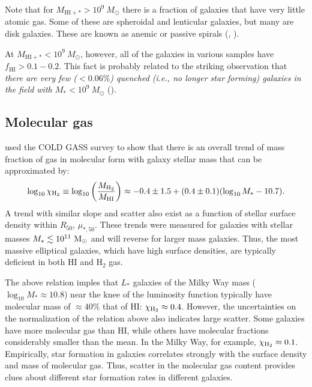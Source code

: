 Note that for $M_{\mathrm{HI+\ast}}>10^9\ M_{\odot}$ there is a fraction of galaxies that have very little atomic gas. Some of these are spheroidal and lenticular galaxies, but many are disk galaxies. These are known as anemic or passive spirals (\href{http://adsabs.harvard.edu/abs/1976ApJ...206..883V}{\citealt{van_den_bergh76}}, \href{http://adsabs.harvard.edu/abs/2002AJ....124..777E}{\citealt{elmegreen_etal02}}).

At $M_{\mathrm{HI+\ast}}<10^9\ M_{\odot}$, however, all of the galaxies in various samples have $f_{\mathrm{HI}}>0.1-0.2$. This fact is probably related to the striking observation that {\it there are very few ($<0.06\%$) quenched (i.e., no longer star forming) galaxies in the field with $M_*<10^9\ M_{\odot}$} (\href{http://adsabs.harvard.edu/abs/2012ApJ...757...85G}{\citealt{geha_etal12}}). 


\subsection{Molecular gas}

 \href{http://adsabs.harvard.edu/abs/2011MNRAS.415...32S}{\citet{saintonge_etal11}} used the COLD GASS survey to show that there is an overall trend of mass fraction of gas in molecular form with galaxy stellar mass that can be approximated by: 
 \begin{equation}
 \log_{10}\chi_{\rm H_2}\equiv \log_{10}\left(\frac{M_{\rm H_2}}{M_{\rm HI}}\right)\approx -0.4\pm 1.5+(0.4\pm 0.1)(\log_{10}M_*-10.7).
\end{equation}
A trend with similar slope and scatter also exist as a function of stellar surface density within $R_{50}$, $\mu_{*,50}$. These trends were measured for galaxies with stellar masses $M_*\lesssim 10^{11}\ \rm M_\odot$ and will reverse for larger mass galaxies. Thus, the most massive elliptical galaxies, which have high surface densities, are typically deficient in both HI and H$_2$ gas.

The above relation imples that $L_*$ galaxies of the Milky Way mass ($\log_{10}M_*\approx 10.8$) near the knee of the luminosity function typically have molecular mass of $\approx 40\%$ that of HI: $\chi_{\rm H_2}\approx 0.4$. However, the uncertainties on the normalization of the relation above also indicates large scatter. Some galaxies have more molecular gas than HI, while others have molecular fractions considerably smaller than the mean. In the Milky Way, for example, $\chi_{\rm H_2}\approx 0.1$. Empirically, star formation in galaxies correlates strongly with the surface density and mass of molecular gas. Thus, scatter in the molecular gas content provides clues about different star formation rates in different galaxies. 


